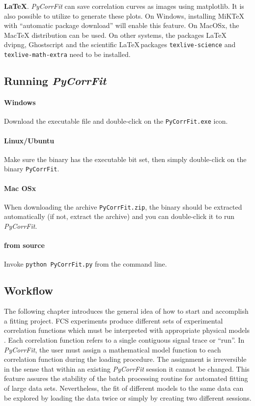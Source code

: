 \vspace{1em}
\noindent \textbf{\LaTeX}. \textit{PyCorrFit} can save correlation curves as images using matplotlib. It is also possible to utilize \Latex to generate these plots. On Windows, installing MiKTeX  with ``automatic package download'' will enable this feature. On MacOSx, the MacTeX distribution can be used. On other systems, the packages \LaTeX\, dvipng, Ghostscript and the scientific \LaTeX \,packages \texttt{texlive-science} and \texttt{texlive-math-extra} need to be installed.

\subsection{Running \textit{PyCorrFit}}
\label{sec:intro.runni}
\paragraph*{Windows}
Download the executable file and double-click on the \texttt{PyCorrFit.exe} icon.
\paragraph*{Linux/Ubuntu}
Make sure the binary has the executable bit set, then simply double-click on the binary  \texttt{PyCorrFit}.
\paragraph*{Mac OSx}
When downloading the archive \texttt{PyCorrFit.zip}, the binary should be extracted automatically (if not, extract the archive) and you can double-click it to run \textit{PyCorrFit}.
\paragraph*{from source}
Invoke \texttt{python PyCorrFit.py} from the command line.

\subsection{Workflow}
\label{sec:intro.workf}

The following chapter introduces the general idea of how to start and accomplish a fitting project. FCS experiments produce different sets of experimental correlation functions which must be interpreted with appropriate physical models . Each correlation function refers to a single contiguous signal trace or ``run''. In \textit{PyCorrFit}, the user must assign a mathematical model function to each correlation function during the loading procedure. The assignment is irreversible in the sense that within an existing \textit{PyCorrFit} session it cannot be changed. This feature assures the stability of the batch processing routine for automated fitting of large data sets. Nevertheless, the fit of different models to the same data can be explored by loading the data twice or simply by creating two different sessions.

